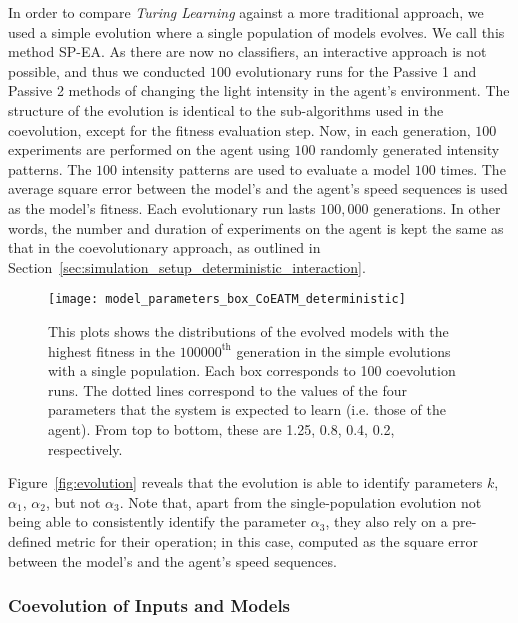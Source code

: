 In order to compare \textit{Turing Learning} against a more traditional approach, we used a simple evolution where a single population of models evolves. We call this method SP-EA. As there are now no classifiers, an interactive approach is not possible, and thus we conducted $100$ evolutionary runs for the Passive 1 and Passive 2 methods of changing the light intensity in the agent's environment. The structure of the evolution is identical to the sub-algorithms used in the coevolution, except for the fitness evaluation step. Now, in each generation, $100$ experiments are performed on the agent using $100$ randomly generated intensity patterns. The $100$ intensity patterns are used to evaluate a model $100$ times. The average square error between the model's and the agent's speed sequences is used as the model's fitness. Each evolutionary run lasts $100,000$ generations. In other words, the number and duration of experiments on the agent is kept the same as that in the coevolutionary approach, as outlined in Section~\ref{sec:simulation_setup_deterministic_interaction}.

\begin{figure}[!t]
	\centering
	\texttt{[image: model\_parameters\_box\_CoEATM\_deterministic]}
	\caption{This plots shows the distributions of the evolved models with the highest fitness in the $100000^\textrm{th}$ generation in the simple evolutions with a single population. Each box corresponds to 100 coevolution runs. The dotted lines correspond to the values of the four parameters that the system is expected to learn (i.e. those of the agent). From top to bottom, these are 1.25, 0.8, 0.4, 0.2, respectively. \label{fig:model_parameters_box_CoEATM_deterministic}}
\end{figure}

Figure~\ref{fig:evolution} reveals that the evolution is able to identify parameters $k$, $\alpha_1$, $\alpha_2$, but not $\alpha_3$. Note that, apart from the single-population evolution not being able to consistently identify the parameter $\alpha_3$, they also rely on a pre-defined metric for their operation; in this case, computed as the square error between the model's and the agent's speed sequences. 

\subsubsection{Coevolution of Inputs and Models}\label{sec:coevolution_inputs_and_models_deterministic_interaction}


